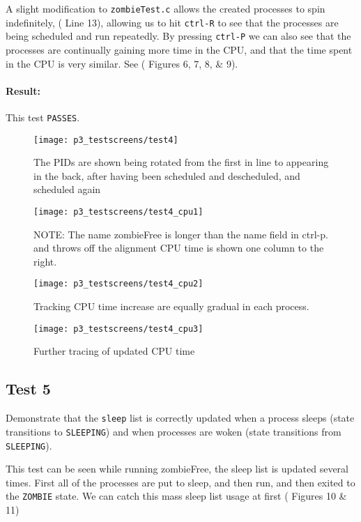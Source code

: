 \documentclass[11pt,letterpaper]{report}
\begin{document}
 	A slight modification to {\tt zombieTest.c} allows the created processes to spin indefinitely, ({\color{red} Line 13}), allowing us to hit {\tt ctrl-R} to see that the processes are being scheduled and run repeatedly. By pressing {\tt ctrl-P} we can also see that the processes are continually gaining more time in the CPU, and that the time spent in the CPU is very similar.
 	See ({\color{red} Figures 6, 7, 8, \& 9}).
 	
 	\paragraph{Result:} This test {\tt PASSES}.
 	
\begin{figure}
	\centering
	\texttt{[image: p3\_testscreens/test4]}
	\caption{The PIDs are shown being rotated from the first in line to appearing in the back, after having been scheduled and descheduled, and scheduled again}
	\label{fig:test4}
\end{figure}

\begin{figure}
	\centering
	\texttt{[image: p3\_testscreens/test4\_cpu1]}
	\caption{NOTE: The name zombieFree is longer than the name field in ctrl-p. and throws off the alignment CPU time is shown one column to the right.}
	\label{fig:test4cpu1}
\end{figure}

\begin{figure}
	\centering
	\texttt{[image: p3\_testscreens/test4\_cpu2]}
	\caption{Tracking CPU time increase are equally gradual in each process.}
	\label{fig:test4cpu2}
\end{figure}

\begin{figure}
	\centering
	\texttt{[image: p3\_testscreens/test4\_cpu3]}
	\caption{Further tracing of updated CPU time}
	\label{fig:test4cpu3}
\end{figure}

 	
 	\subsection{Test 5}
 	Demonstrate that the {\tt sleep} list is correctly updated when a process sleeps (state transitions to {\tt SLEEPING}) and when processes are woken (state transitions from {\tt SLEEPING}).
 	
 	This test can be seen while running zombieFree, the sleep list is updated several times. First all of the processes are put to sleep, and then run, and then exited to the {\tt ZOMBIE} state. We can catch this mass sleep list usage at first ({\color{red} Figures 10 \& 11})
 	
\end{document}
